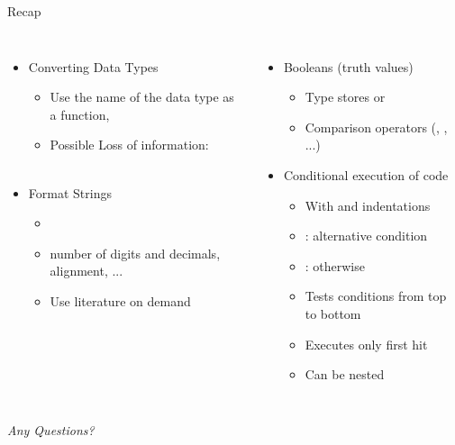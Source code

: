 
\begin{frame}[t,plain]
\titlepage
\end{frame}


\begin{frame}{Recap}
%
\begin{columns}[T]
\begin{itemize}
\item Converting Data Types
	\begin{itemize}
	\item Use the name of the data type as a function, \zB {}
	\item Possible Loss of information: \\
		 ~\thus~ 
	\end{itemize}
\item Format Strings
	\begin{itemize}
	\item {}
	\item number of digits and decimals, alignment, ...
	\item Use literature on demand
	\end{itemize}
\end{itemize}
%
\begin{itemize}
\item Booleans (truth values)
	\begin{itemize}
	\item Type  stores  or 
	\item Comparison operators (\inPy{==}, \inPy{>=}, ...)
	\end{itemize}
\item Conditional execution of code
	\begin{itemize}
	\item With  and indentations
	\item {}: alternative condition
	\item {}: otherwise
	\item Tests conditions from top to bottom
	\item Executes only first hit
	\item Can be nested
	\end{itemize}
\end{itemize}
\end{columns}
%
\begin{center}
	\emph{Any Questions?}
\end{center}
%
\end{frame}

